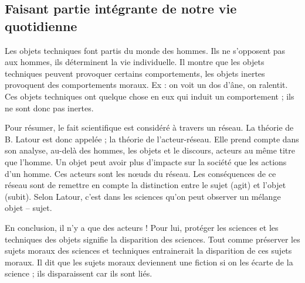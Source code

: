 \subsection{Faisant partie intégrante de notre vie quotidienne}
Les objets techniques font partis du monde des hommes.
Ils ne s'opposent pas aux hommes, ils déterminent la vie individuelle.
Il montre que les objets techniques peuvent provoquer certains comportements, les objets inertes provoquent des comportements moraux.
Ex : on voit un dos d'âne, on ralentit.
Ces objets techniques ont quelque chose en eux qui induit un comportement ; ils ne sont donc pas inertes.

Pour résumer, le fait scientifique est considéré à travers un réseau.
La théorie de B.
Latour est donc appelée ;  la théorie de l'acteur-réseau.
Elle prend compte dans son analyse, au-delà des hommes, les objets et le discours, acteurs au même titre que l'homme.
Un objet peut avoir plus d'impacte sur la société que les actions d'un homme.
Ces acteurs sont les nœuds du réseau.
Les conséquences de ce réseau sont de remettre en compte la distinction entre le sujet (agit) et l'objet (subit).
Selon Latour, c'est dans les sciences qu'on peut observer un mélange objet – sujet.

En conclusion, il n'y a que des acteurs ! Pour lui, protéger les sciences et les techniques des objets signifie la disparition des sciences.
Tout comme préserver les sujets moraux des sciences et techniques entrainerait la disparition de ces sujets moraux.
Il dit que les sujets moraux deviennent une fiction si on les écarte de la science ; ils disparaissent car ils sont liés.

